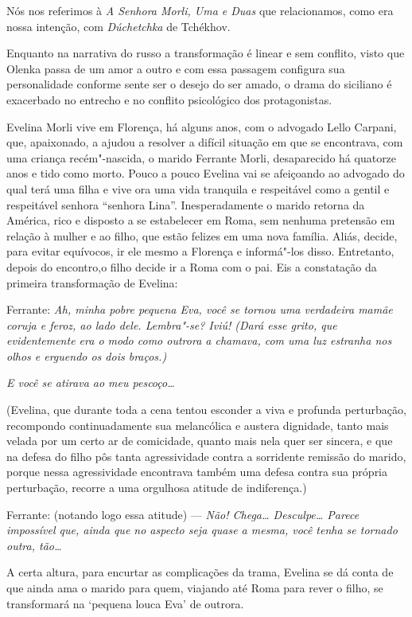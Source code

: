 Nós nos referimos à \emph{A Senhora Morli, Uma e Duas} que relacionamos,
como era nossa intenção, com \emph{Dúchetchka} de Tchékhov.

Enquanto na narrativa do russo a transformação é linear e sem conflito,
visto que Olenka passa de um amor a outro e com essa passagem configura
sua personalidade conforme sente ser o desejo do ser amado, o drama do
siciliano é exacerbado no entrecho e no conflito psicológico dos
protagonistas.

Evelina Morli vive em Florença, há alguns anos, com o advogado Lello
Carpani, que, apaixonado, a ajudou a resolver a difícil situação em que
se encontrava, com uma criança recém"-nascida, o marido Ferrante Morli,
desaparecido há quatorze anos e tido como morto. Pouco a pouco Evelina
vai se afeiçoando ao advogado do qual terá uma filha e vive ora uma vida
tranquila e respeitável como a gentil e respeitável senhora ``senhora
Lina''. Inesperadamente o marido retorna da América, rico e disposto a
se estabelecer em Roma, sem nenhuma pretensão em relação à mulher e ao
filho, que estão felizes em uma nova família. Aliás, decide, para evitar
equívocos, ir ele mesmo a Florença e informá"-los disso. Entretanto,
depois do encontro,o filho decide ir a Roma com o pai. Eis a constatação
da primeira transformação de Evelina:

Ferrante: \emph{Ah, minha pobre pequena Eva, você se tornou uma
verdadeira mamãe coruja e feroz, ao lado dele. Lembra"-se? Iviú! (Dará
esse grito, que evidentemente era o modo como outrora a chamava, com uma
luz estranha nos olhos e erguendo os dois braços.)}

\emph{E você se atirava ao meu pescoço\ldots{}}

(Evelina, que durante toda a cena tentou esconder a viva e profunda
perturbação, recompondo continuadamente sua melancólica e austera
dignidade, tanto mais velada por um certo ar de comicidade, quanto mais
nela quer ser sincera, e que na defesa do filho pôs tanta agressividade
contra a sorridente remissão do marido, porque nessa agressividade
encontrava também uma defesa contra sua própria perturbação, recorre a
uma orgulhosa atitude de indiferença.)

Ferrante: (notando logo essa atitude) --- \emph{Não! Chega\ldots{} Desculpe\ldots{}
Parece impossível que, ainda que no aspecto seja quase a mesma, você
tenha se tornado outra, tão\ldots{}}

A certa altura, para encurtar as complicações da trama, Evelina se dá
conta de que ainda ama o marido para quem, viajando até Roma para rever
o filho, se transformará na `pequena louca Eva' de outrora.

